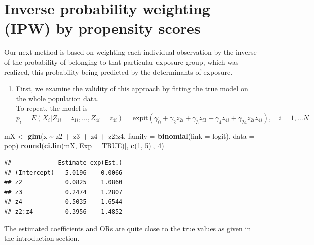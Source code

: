 \documentclass[
]{book}
\newenvironment{Shaded}{\begin{snugshade}}{\end{snugshade}}
\newcommand{\AttributeTok}[1]{\textcolor[rgb]{0.13,0.29,0.53}{#1}}
\newcommand{\ConstantTok}[1]{\textcolor[rgb]{0.56,0.35,0.01}{#1}}
\newcommand{\DecValTok}[1]{\textcolor[rgb]{0.00,0.00,0.81}{#1}}
\newcommand{\FunctionTok}[1]{\textcolor[rgb]{0.13,0.29,0.53}{\textbf{#1}}}
\newcommand{\NormalTok}[1]{#1}
\newcommand{\OtherTok}[1]{\textcolor[rgb]{0.56,0.35,0.01}{#1}}
\newcommand{\SpecialCharTok}[1]{\textcolor[rgb]{0.81,0.36,0.00}{\textbf{#1}}}
\providecommand{\tightlist}{%
  \setlength{\itemsep}{0pt}\setlength{\parskip}{0pt}}
\theoremstyle{definition}
\theoremstyle{definition}
\theoremstyle{definition}
\theoremstyle{definition}
\theoremstyle{remark}
\begin{document}
\section{Inverse probability weighting (IPW) by propensity scores}\label{inverse-probability-weighting-ipw-by-propensity-scores}

Our next method is based on weighting each individual observation by the
inverse of the probability of belonging to that particular exposure
group, which was realized, this probability being predicted by the
determinants of exposure.

\begin{enumerate}
\def\labelenumi{\arabic{enumi}.}
\tightlist
\item
  First, we examine the validity of this approach by fitting the true
  model on the whole population data.\\
  To repeat, the model is \[ 
   p_i = E(X_i| Z_{1i} = z_{1i}, \dots, Z_{4i} = z_{4i})
   = \text{expit}(\gamma_0 + \gamma_2 z_{2i} +
    \gamma_3 z_{i3} + \gamma_4 z_{4i} + \gamma_{24} z_{2i}z_{4i}), \quad i=1, \dots N 
   \]
\end{enumerate}

\begin{Shaded}
\begin{Highlighting}[]
\NormalTok{mX }\OtherTok{\textless{}{-}} \FunctionTok{glm}\NormalTok{(x }\SpecialCharTok{\textasciitilde{}}\NormalTok{ z2 }\SpecialCharTok{+}\NormalTok{ z3 }\SpecialCharTok{+}\NormalTok{ z4 }\SpecialCharTok{+}\NormalTok{ z2}\SpecialCharTok{:}\NormalTok{z4,}
  \AttributeTok{family =} \FunctionTok{binomial}\NormalTok{(}\AttributeTok{link =}\NormalTok{ logit), }\AttributeTok{data =}\NormalTok{ pop)}
\FunctionTok{round}\NormalTok{(}\FunctionTok{ci.lin}\NormalTok{(mX, }\AttributeTok{Exp =} \ConstantTok{TRUE}\NormalTok{)[, }\FunctionTok{c}\NormalTok{(}\DecValTok{1}\NormalTok{, }\DecValTok{5}\NormalTok{)], }\DecValTok{4}\NormalTok{)}
\end{Highlighting}
\end{Shaded}

\begin{verbatim}
##             Estimate exp(Est.)
## (Intercept)  -5.0196    0.0066
## z2            0.0825    1.0860
## z3            0.2474    1.2807
## z4            0.5035    1.6544
## z2:z4         0.3956    1.4852
\end{verbatim}

The estimated coefficients and ORs are quite close to the true values as
given in the introduction section.
\end{document}

